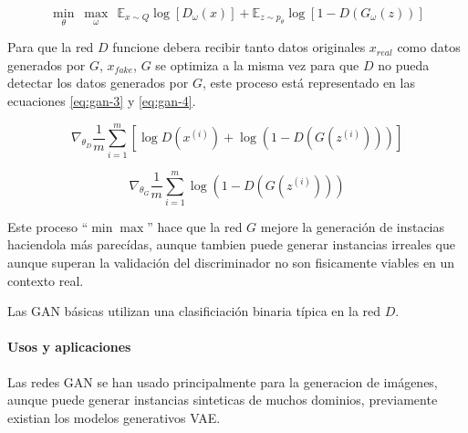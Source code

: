 \begin{equation}
    \min_{\theta}~\max_{\omega}~~\mathbb{E}_{x\sim{}Q} \log\left[D_{\omega}(x)\right] + \mathbb{E}_{z \sim{}p_{\theta}} \log\left[1-D(G_{\omega}(z))\right]
    \label{eq:gan-2}
\end{equation}

Para que la red $D$ funcione debera recibir tanto datos originales $x_{real}$ como datos generados por $G$, $x_{fake}$, $G$ se optimiza a la misma vez para que $D$ no pueda detectar los datos generados por $G$, este proceso está representado en las ecuaciones \ref{eq:gan-3} y \ref{eq:gan-4}.

\begin{equation}
    \nabla_{\theta_{D}} \frac{1}{m} \sum_{i=1}^{m} \left[ \log D(x^{(i)}) + \log(1-D(G(z^{(i)})))  \right]
    \label{eq:gan-3}
\end{equation}

\begin{equation}
    \nabla_{\theta_{G}} \frac{1}{m} \sum_{i=1}^{m} \log(1-D(G(z^{(i)})))
    \label{eq:gan-4}
\end{equation}

Este proceso ``$\min\max$'' hace que la red $G$ mejore la generación de instacias haciendola más parecídas, aunque tambien puede generar instancias irreales que aunque superan la validación del discriminador no son fisicamente viables en un contexto real.

Las \gls{GAN} básicas utilizan una clasificiación binaria típica en la red ${D}$.

\paragraph*{Usos y aplicaciones}

Las redes \gls{GAN} se han usado principalmente para la generacion de imágenes, aunque puede generar instancias sinteticas de muchos dominios, previamente existian los modelos generativos \gls{VAE}.




